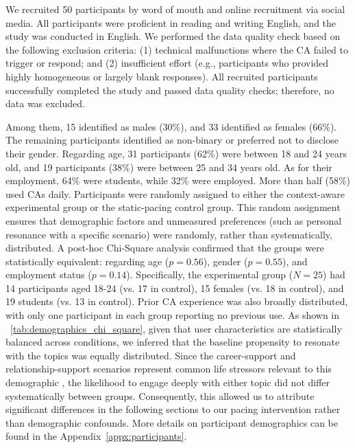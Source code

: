We recruited 50 participants by word of mouth and online recruitment via social media. All participants were proficient in reading and writing English, and the study was conducted in English. 
We performed the data quality check based on the following exclusion criteria: (1) technical malfunctions where the CA failed to trigger or respond; and (2) insufficient effort (e.g., participants who provided highly homogeneous or largely blank responses). All recruited participants successfully completed the study and passed data quality checks; therefore, no data was excluded.

Among them, 15 identified as males (30\%), and 33 identified as females (66\%). The remaining participants identified as non-binary or preferred not to disclose their gender. Regarding age, 31 participants (62\%) were between 18 and 24 years old, and 19 participants (38\%) were between 25 and 34 years old. As for their employment, 64\% were students, while 32\% were employed. More than half (58\%) used CAs daily. 
Participants were randomly assigned to either the context-aware experimental group or the static-pacing control group. This random assignment ensures that demographic factors and unmeasured preferences (such as personal resonance with a specific scenario) were randomly, rather than systematically, distributed. A post-hoc Chi-Square analysis confirmed that the groups were statistically equivalent: regarding age ($p=0.56$), gender ($p=0.55$), and employment status ($p=0.14$). Specifically, the experimental group ($N=25$) had 14 participants aged 18-24 (vs. 17 in control), 15 females (vs. 18 in control), and 19 students (vs. 13 in control). Prior CA experience was also broadly distributed, with only one participant in each group reporting no previous use.
As shown in \tablename{~\ref{tab:demographics_chi_square}}, given that user characteristics are statistically balanced across conditions, we inferred that the baseline propensity to resonate with the topics was equally distributed. Since the career-support and relationship-support scenarios represent common life stressors relevant to this demographic \cite{sampaio2025career, price2016young}, the likelihood to engage deeply with either topic did not differ systematically between groups. Consequently, this allowed us to attribute significant differences in the following sections to our pacing intervention rather than demographic confounds.
More details on participant demographics can be found in the Appendix~\ref{appx:participants}.


